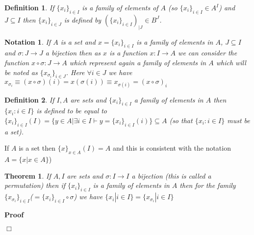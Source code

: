 \documentclass{book}
\newenvironment{proof}{\noindent\textbf{Proof\ }}{\hspace*{\fill}$\Box$\medskip}
\newtheorem{definition}{Definition}
{\theorembodyfont{\rmfamily}\newtheorem{example}{Example}}
\newtheorem{notation}{Notation}
{\theorembodyfont{\rmfamily}\newtheorem{note}{Note}}
\newtheorem{theorem}{Theorem}
\begin{document}
{{\begin{definition}
  If $\{ x_i \}_{i \in I}$ is a family of elements of $A$ (so $\{ x_i \}_{i
  \in I} \in A^I$) and $J \subseteq I$ then $\{ x_i \}_{i \in J}$ is defined
  by $(\{ x_i \}_{i \in I})_{|J} \in B^J$.
\end{definition}

\begin{notation}
  If $A$ is a set and $x = \{ x_i \}_{i \in I}$ is a family of elements in
  $A$, $J \subseteq I$ and $\sigma : J \rightarrow J$ a bijection then as $x$
  is a function $x : I \rightarrow A$ we can consider the function $x \circ
  \sigma : J \rightarrow A$ which represent again a family of elements in $A$
  which will be noted as $\{ x_{\sigma_i} \}_{i \in J}$. Here $\forall i \in
  J$ we have $x_{\sigma_i} \equiv (x \circ \sigma) (i) = x (\sigma (i)) \equiv
  x_{\sigma (i)} = (x \circ \sigma)_i$
\end{notation}

\begin{definition}
  \label{set of family of elements}If $I, A$ are sets and $\{ x_i \}_{i \in
  I}$ a family of elements in $A$ then $\{ x_i : i \in I \}$ is defined to be
  equal to $\{ x_i \}_{i \in I} (I) = \{ y \in A| \exists i \in I \vdash y =
  \{ x_i \}_{i \in I} (i) \} \subseteq A$ (so that $\{ x_i : i \in I \}$ must
  be a set). 
\end{definition}

\begin{example}
  \label{selfindexed family image}If $A$ is a set then $\{ x \}_{x \in A} (I)
  = A$ and this is consistent with the notation $A = \{ x|x \in A \}$)
\end{example}

\begin{theorem}
  \label{permutation of a family gives same set as the family}If $A, I$ are
  sets and $\sigma : I \rightarrow I$ a bijection (this is called a
  permutation) then if $\{ x_i \}_{i \in I}$ is a family of elements in $A$
  then for the family $\{ x_{\sigma_i} \}_{i \in I}$($= \{ x_i \}_{i \in I}
  \circ \sigma$) we have $\{ x_i |i \in I \} = \{ x_{\sigma_i} |i \in I \}$
\end{theorem}

\begin{proof}
  

\end{proof}}}
\end{document}
